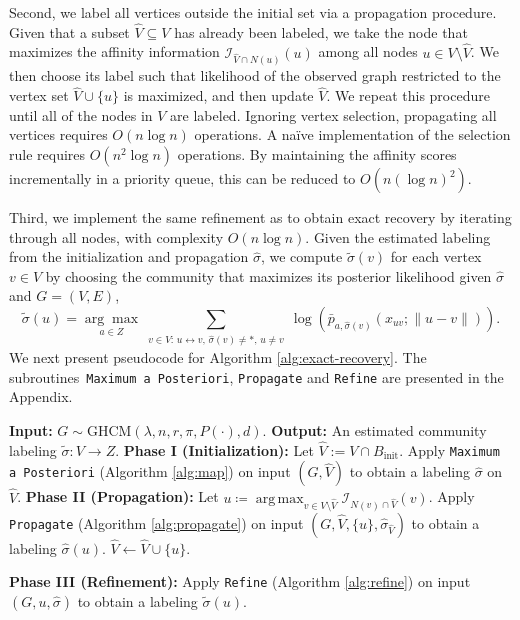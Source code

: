 \documentclass[11pt, a4paper]{amsart}
\newcommand{\1}{\mathbf{1}}
\newcommand{\visible}{\leftrightarrow{}}
\theoremstyle{definition}
\theoremstyle{remark}
\theoremstyle{definition}
\DeclareMathOperator*{\argmax}{arg\,max}
\begin{document}
Second, we label all vertices outside the initial set via a propagation procedure. Given that a subset $\hat V\subseteq V$ has already been labeled, we take the node that maximizes the affinity information $\mathcal I_{\hat V \cap N(u)}(u)$ among all nodes $u \in V \setminus \hat V$. We then choose its label such that likelihood of the observed graph restricted to the vertex set $\hat V \cup \{u\}$ is maximized, and then update $\hat V$. We repeat this procedure until all of the nodes in $V$ are labeled. Ignoring vertex selection, propagating all vertices requires
$O(n\log n)$ operations. A naïve implementation of
the selection rule requires $O(n^2\log n)$ operations. By maintaining
the affinity scores incrementally in a priority queue, this can be
reduced to $O(n(\log n)^2)$. 

Third, we implement the same refinement as \cite{gaudio2026jan} to obtain exact recovery by iterating through all nodes, with complexity $O(n \log n)$. Given the estimated labeling from the initialization and propagation $\hat{\sigma}$, we compute $\tilde{\sigma}(v)$ for each vertex $v \in  V$ by choosing the community that maximizes its posterior likelihood given $\hat{\sigma}$ and $G = ({V}, E)$,
\[\tilde{\sigma}(u)
=
\underset{a \in Z}{\arg\max}
\sum_{\substack{v\in V:\,
u\visible v,\,
\hat\sigma(v)\neq *,\,
u\neq v}}
\log\left(
\bar p_{a,\hat\sigma(v)}
(x_{uv};\|u-v\|)
\right).\]
We next present pseudocode for Algorithm \ref{alg:exact-recovery}. The subroutines~\texttt{Maximum a Posteriori}, \texttt{Propagate} and \texttt{Refine} are presented in the Appendix.
\begingroup
\renewcommand{\thealgorithm}{A}
\begin{algorithm}[H]
\caption{Discretization-free Exact Recovery}
\label{alg:exact-recovery}
\begin{algorithmic}[1]
\Statex \textbf{Input:} $G\sim \mathrm{GHCM}(\lambda,n,r,\pi,P(\cdot),d)$.
\Statex \textbf{Output:} An estimated community labeling $\widetilde\sigma: V\to Z$.
\Statex
\State \textbf{Phase I (Initialization):}
\State  Let $\hat V:= V \cap B_{\mathrm{init}}$. 
\State Apply \texttt{Maximum a Posteriori} (Algorithm \ref{alg:map}) on input $(G, \hat V)$ to obtain a labeling $\hat{\sigma}$ on $\hat V$.
\Statex
\State \textbf{Phase II (Propagation):}
    \State Let $u \coloneqq \argmax_{v\in V \setminus \hat V} \mathcal I_{N(v) \cap \hat V}(v)$.
   \State  Apply \texttt{Propagate} (Algorithm \ref{alg:propagate}) on input $(G,\hat V,\{u\},\hat\sigma_{\hat V})$ to obtain a labeling $\hat\sigma(u)$.
\State $\hat V\leftarrow\hat V\cup\{u\}$.
\EndWhile


\Statex
\State \textbf{Phase III (Refinement):}
\State Apply \texttt{Refine} (Algorithm \ref{alg:refine}) on input $(G, u,\hat \sigma)$ to obtain a labeling $\tilde{\sigma}(u)$.
\EndFor
\end{algorithmic}
\end{algorithm}
\endgroup
\end{document}
